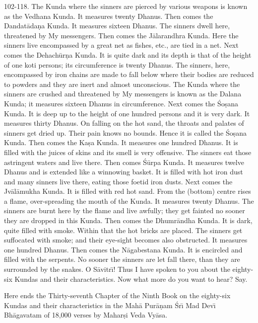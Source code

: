 102-118. The Kunda where the sinners are pierced by various weapons is known as the Vedhana Kunda. It measures twenty Dhanus. Then comes the Dandat\=ada\d{n}a Kunda. It measures sixteen Dhanus. The sinners dwell here, threatened by My messengers. Then comes the J\=alarandhra Kunda. Here the sinners live encompassed by a great net as fishes, etc., are tied in a net. Next comes the Dehach\=ur\d{n}a Kunda. It is quite dark and its depth is that of the height of one koti persons; its circumference is twenty Dhanus. The sinners, here, encompassed by iron chains are made to fall below where their bodies are reduced to powders and they are inert and almost unconscious. The Kunda where the sinners are crushed and threatened by My messengers is known as the Dalana Kunda; it measures sixteen Dhanus in circumference. Next comes the \'So\d{s}ana Kunda. It is deep up to the height of one hundred persons and it is very dark. It measures thirty Dhanus. On falling on the hot sand, the throats and palates of sinners get dried up. Their pain knows no bounds. Hence it is called the \'So\d{s}ana Kunda. Then comes the Ka\d{s}a Kunda. It measures one hundred Dhanus. It is filled with the juices of skins and its smell is very offensive. The sinners eat those astringent waters and live there. Then comes \'S\=urpa Kunda. It measures twelve Dhanus and is extended like a winnowing basket. It is filled with hot iron dust and many sinners live there, eating those foetid iron dusts. Next comes the Jv\=al\=amukha Kunda. It is filled with red hot sand. From the (bottom) centre rises a flame, over-spreading the mouth of the Kunda. It measures twenty Dhanus. The sinners are burnt here by the flame and live awfully; they get fainted no sooner they are dropped in this Kunda. Then comes the Dhumr\=andha Kunda. It is dark, quite filled with smoke. Within that the hot bricks are placed. The sinners get suffocated with smoke; and their eye-sight becomes also obstructed. It measures one hundred Dhanus. Then comes the N\=agabestana Kunda. It is encircled and filled with the serpents. No sooner the sinners are let fall there, than they are surrounded by the snakes. O S\=avitr\={\i}! Thus I have spoken to you about the eighty-six Kundas and their characteristics. Now what more do you want to hear? Say.

Here ends the Thirty-seventh Chapter of the Ninth Book on the eighty-six Kundas and their characteristics in the Mah\=a Pur\=a\d{n}am \'Sr\={\i} Mad Dev\={\i} Bh\=agavatam of 18,000 verses by Mahar\d{s}i Veda Vy\=asa.



